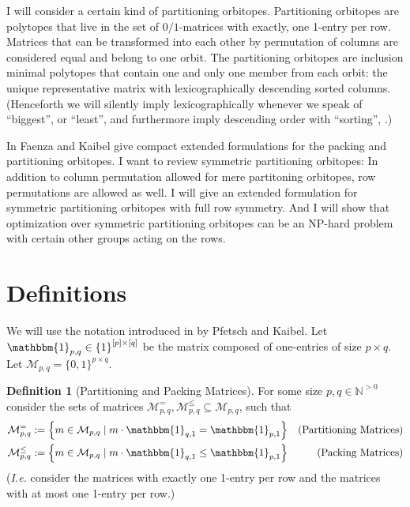 \documentclass[a4paper]{amsart}
\theoremstyle{lemma}
\theoremstyle{definition}
\newtheorem{defn}[theorem]{Definition}
\theoremstyle{remark}
\def\Ie{\emph{I.e.}}
\newcommand{\lrE}[1]{\ensuremath{\left[ #1 \right]}}
\newcommand{\lrM}[1]{\ensuremath{\left\{ #1 \right\}}}
\newcommand{\naturals}{\ensuremath{\mathbb{N}}}
\newcommand{\M}{\ensuremath{\mathcal{M}}}
\begin{document}
I will consider a certain kind of partitioning orbitopes.
Partitioning orbitopes are polytopes that live in the set of
\(0/1\)-matrices with exactly, one 1-entry per row.  Matrices that can
be transformed into each other by permutation of columns are
considered equal and belong to one orbit.  The partitioning orbitopes
are inclusion minimal polytopes that contain one and only one member
from each orbit: the unique representative matrix with
lexicographically descending sorted columns.  (Henceforth we will
silently imply lexicographically whenever we speak of ``biggest'', or
``least'', and furthermore imply descending order with ``sorting'', .)

In \cite{faenza-2008} Faenza and Kaibel give compact extended
formulations for the packing and partitioning orbitopes.
I want to review symmetric partitioning orbitopes: In addition
to column permutation allowed for mere partitoning orbitopes, row
permutations are allowed as well.  I will give an extended formulation
for symmetric partitioning orbitopes with full row symmetry. And I
will show that optimization over symmetric partitioning orbitopes can
be an NP-hard problem with certain other groups acting on the rows.



\section{Definitions}
We will use the notation introduced in \cite{orbi} by Pfetsch
and Kaibel.  Let \(\mathbbm{1}_{p,q} \in \lrM{1}^{\lrE{p}
  \times \lrE{q}}\) be the matrix composed of one-entries of size \(p \times q\).
Let \(\M_{p,q} = \{0, 1\}^{p \times q} \). 

\begin{defn}[Partitioning and Packing Matrices]
  For some size \(p, q \in \naturals^{>0}\) consider the sets of
  matrices \(\M_{p,q}^{=},\M_{p,q}^{\leq} \subseteq \M_{p, q}\), such
  that 
  \begin{align}
    \M_{p,q}^{=} & := \lrM{m \in \M_{p,q} \mid m \cdot \mathbbm{1}_{q, 1} = \mathbbm{1}_{p, 1}} & \text{(Partitioning Matrices)}\\
    \M_{p,q}^{\leq} & := \lrM{m \in \M_{p,q} \mid m \cdot \mathbbm{1}_{q, 1} \leq \mathbbm{1}_{p, 1}} & \text{(Packing Matrices)}
  \end{align}
  (\Ie{} consider the matrices with exactly one 1-entry per row and the matrices with at most one 1-entry per row.)
\end{defn}
\end{document}
